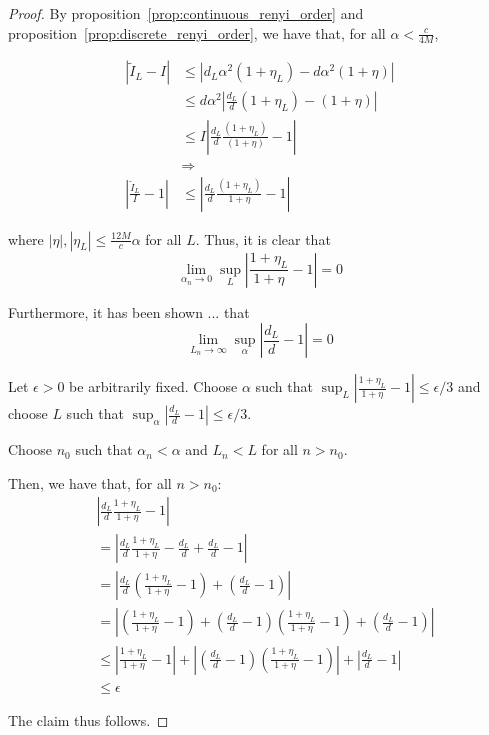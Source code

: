 \documentclass{article}
\begin{document}
\begin{proof}

By proposition~\ref{prop:continuous_renyi_order} and proposition~\ref{prop:discrete_renyi_order}, we have that, for all $\alpha < \frac{c}{4M}$,

\begin{align*}
| \tilde{I}_L - I | 
 & \leq \left| d_L \alpha^2 ( 1 + \eta_L) - d \alpha^2 ( 1 + \eta) \right| \\
  &\leq d\alpha^2 \left| \frac{d_L}{d} (1 + \eta_L) - (1+\eta) \right|  \\
 &\leq I \left| \frac{d_L}{d} \frac{(1 + \eta_L)}{(1+\eta)} - 1 \right| \\
& \Rightarrow \\
\left| \frac{\tilde{I}_L}{I} - 1 \right| &\leq 
\left | \frac{d_L}{d} \frac{(1+\eta_L)}{1 + \eta} - 1 \right|
\end{align*}

where $|\eta|, |\eta_L| \leq \frac{12M}{c} \alpha$ for all $L$. Thus, it is clear that 
\[
\lim_{\alpha_n \rightarrow 0} \sup_L \left| \frac{1+\eta_L}{1+\eta} - 1 \right| = 0
\]

Furthermore, it has been shown ... that
\[
\lim_{L_n \rightarrow \infty} \sup_\alpha \left| \frac{d_L}{d} - 1 \right| = 0
\]

Let $\epsilon > 0$ be arbitrarily fixed. 
Choose $\alpha$ such that $\sup_L \left| \frac{1+\eta_L}{1+\eta} - 1 \right| \leq \epsilon/3$ and choose $L$ such that $\sup_\alpha \left| \frac{d_L}{d} -1 \right| \leq \epsilon/3$. 

Choose $n_0$ such that $\alpha_n < \alpha$ and $L_n < L$ for all $n > n_0$. 

Then, we have that, for all $n > n_0$:
\begin{align*}
& \left| \frac{d_L}{d} \frac{1+\eta_L}{1+\eta} - 1 \right | \\
&= \left| \frac{d_L}{d} \frac{1 + \eta_L}{1 + \eta} - \frac{d_L}{d} + \frac{d_L}{d} - 1 \right| \\
&= \left| \frac{d_L}{d} \left( \frac{1+\eta_L}{1+\eta} - 1 \right) + \left( \frac{d_L}{d} - 1 \right) \right| \\
&= \left| \left( \frac{1+\eta_L}{1 + \eta} - 1 \right) + \left( \frac{d_L}{d} -1 \right) \left( \frac{1+\eta_L}{1+\eta} - 1 \right) + \left( \frac{d_L}{d} - 1 \right) \right| \\
&\leq  \left| \frac{1+\eta_L}{1 + \eta} - 1 \right| + \left| \left( \frac{d_L}{d} -1 \right) \left( \frac{1+\eta_L}{1+\eta} - 1 \right) \right| + \left| \frac{d_L}{d} - 1  \right| \\
&\leq \epsilon
\end{align*}

The claim thus follows. 

\end{proof}
\end{document}
